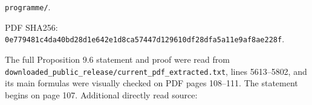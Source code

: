 \documentclass[10pt,a4paper]{article}
\begin{document}
\texttt{programme/}.

PDF SHA256: \texttt{0\allowbreak{}e\allowbreak{}7\allowbreak{}7\allowbreak{}9\allowbreak{}4\allowbreak{}8\allowbreak{}1\allowbreak{}c\allowbreak{}4\allowbreak{}d\allowbreak{}a\allowbreak{}4\allowbreak{}0\allowbreak{}b\allowbreak{}d\allowbreak{}2\allowbreak{}8\allowbreak{}d\allowbreak{}1\allowbreak{}e\allowbreak{}6\allowbreak{}4\allowbreak{}2\allowbreak{}e\allowbreak{}1\allowbreak{}d\allowbreak{}8\allowbreak{}c\allowbreak{}a\allowbreak{}5\allowbreak{}7\allowbreak{}4\allowbreak{}4\allowbreak{}7\allowbreak{}d\allowbreak{}1\allowbreak{}2\allowbreak{}9\allowbreak{}6\allowbreak{}1\allowbreak{}0\allowbreak{}d\allowbreak{}f\allowbreak{}2\allowbreak{}8\allowbreak{}d\allowbreak{}f\allowbreak{}a\allowbreak{}5\allowbreak{}a\allowbreak{}1\allowbreak{}1\allowbreak{}e\allowbreak{}9\allowbreak{}a\allowbreak{}f\allowbreak{}8\allowbreak{}a\allowbreak{}e\allowbreak{}2\allowbreak{}2\allowbreak{}8\allowbreak{}f}.

The full Proposition 9.6 statement and proof were read from \texttt{d\allowbreak{}o\allowbreak{}w\allowbreak{}n\allowbreak{}l\allowbreak{}o\allowbreak{}a\allowbreak{}d\allowbreak{}e\allowbreak{}d\allowbreak{}\_\allowbreak{}p\allowbreak{}u\allowbreak{}b\allowbreak{}l\allowbreak{}i\allowbreak{}c\allowbreak{}\_\allowbreak{}r\allowbreak{}e\allowbreak{}l\allowbreak{}e\allowbreak{}a\allowbreak{}s\allowbreak{}e\allowbreak{}/\allowbreak{}c\allowbreak{}u\allowbreak{}r\allowbreak{}r\allowbreak{}e\allowbreak{}n\allowbreak{}t\allowbreak{}\_\allowbreak{}p\allowbreak{}d\allowbreak{}f\allowbreak{}\_\allowbreak{}e\allowbreak{}x\allowbreak{}t\allowbreak{}r\allowbreak{}a\allowbreak{}c\allowbreak{}t\allowbreak{}e\allowbreak{}d\allowbreak{}.\allowbreak{}t\allowbreak{}x\allowbreak{}t}, lines 5613--5802, and its main formulas were visually checked on PDF pages 108--111. The statement begins on page 107. Additional directly read source:
\end{document}

